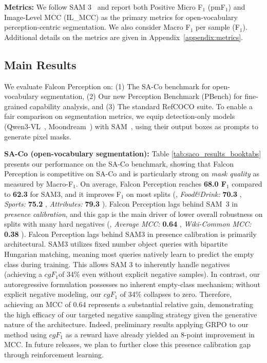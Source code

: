 \noindent \textbf{Metrics:} We follow SAM 3~\citep{carion2025sam3} and report both Positive Micro F$_1$ (pmF$_1$) and Image-Level MCC (IL\_MCC) as the primary metrics for open-vocabulary perception-centric segmentation. We also consider Macro F$_1$ per sample (F$_1$). Additional details on the metrics are given in Appendix~\ref{appendix:metrics}.


\subsection{Main Results}
We evaluate Falcon Perception on: (1) The SA-Co benchmark for open-vocabulary segmentation, (2) Our new Perception Benchmark (PBench) for fine-grained capability analysis, and (3) The standard RefCOCO suite. To enable a fair comparison on segmentation metrics, we equip detection-only models (Qwen3-VL~\citep{qwen3}, Moondream~\citep{moondream2,moondream3}) with SAM~\citep{kirillov2023segment}, using their output boxes as prompts to generate pixel masks.

\noindent \textbf{SA-Co (open-vocabulary segmentation):} Table \ref{tab:saco_results_booktabs} presents our performance on the SA-Co benchmark, showing that Falcon Perception is competitive on SA-Co and is particularly strong on \emph{mask quality} as measured by Macro-F$_1$. On average, Falcon Perception reaches \textbf{68.0 F$_1$} compared to \textbf{62.3} for SAM3, and it improves F$_1$ on most splits (\eg, \textit{Food\&Drink:} \textbf{70.3 }, \textit{Sports:} \textbf{75.2 }, \textit{Attributes:} \textbf{79.3 }). Falcon Perception lags behind SAM~3 in \emph{presence calibration}, and this gap is the main driver of lower overall robustness on splits with many hard negatives (\eg, \textit{Average MCC:} \textbf{0.64 }, \textit{Wiki-Common MCC:} \textbf{0.38 }). Falcon Perception lags behind SAM3 in presence calibration is primarily architectural. SAM3 utilizes fixed number object queries with bipartite Hungarian matching, meaning most queries natively learn to predict the empty class during training. This allows SAM 3 to inherently handle negatives (achieving a $cgF_1$of 34\% even without explicit negative samples). In contrast, our autoregressive formulation possesses no inherent empty-class mechanism; without explicit negative modeling, our $cgF_1$ of 34\% collapses to zero. Therefore, achieving an MCC of 0.64 represents a substantial relative gain, demonstrating the high efficacy of our targeted negative sampling strategy given the generative nature of the architecture. Indeed, preliminary results applying GRPO to our method using  $cgF_1$ as a reward have already yielded an 8-point improvement in MCC. In future releases, we plan to further close this presence calibration gap through reinforcement learning.

